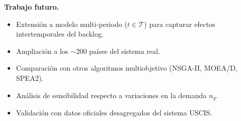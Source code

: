 \documentclass[12pt,letterpaper]{article}
\begin{document}
\begin{resultbox}
\textbf{Trabajo futuro.}
\begin{itemize}
    \item Extensión a modelo multi-periodo ($t \in \mathcal{T}$) para capturar efectos intertemporales del backlog.
    \item Ampliación a los $\sim$200 países del sistema real.
    \item Comparación con otros algoritmos multiobjetivo (NSGA-II, MOEA/D, SPEA2).
    \item Análisis de sensibilidad respecto a variaciones en la demanda $n_g$.
    \item Validación con datos oficiales desagregados del sistema USCIS.
\end{itemize}
\end{resultbox}

\newpage
\printbibliography[title={Referencias}]
\end{document}
